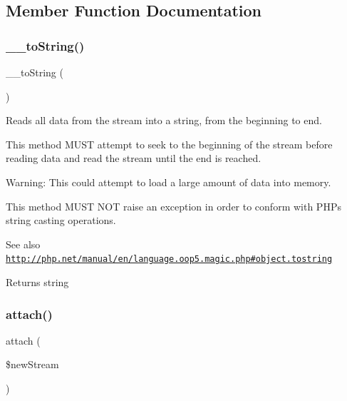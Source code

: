\subsection{Member Function Documentation}
\mbox{\label{class_pes_1_1_http_1_1_stream_a7516ca30af0db3cdbf9a7739b48ce91d}} 
\subsubsection{\texorpdfstring{\+\_\+\+\_\+to\+String()}{\_\_toString()}}
{\footnotesize\ttfamily \+\_\+\+\_\+to\+String (\begin{DoxyParamCaption}{ }\end{DoxyParamCaption})}

Reads all data from the stream into a string, from the beginning to end.

This method M\+U\+ST attempt to seek to the beginning of the stream before reading data and read the stream until the end is reached.

Warning\+: This could attempt to load a large amount of data into memory.

This method M\+U\+ST N\+OT raise an exception in order to conform with P\+HP\textquotesingle{}s string casting operations.

\begin{DoxySeeAlso}{See also}
\href{http://php.net/manual/en/language.oop5.magic.php#object.tostring}{\tt http\+://php.\+net/manual/en/language.\+oop5.\+magic.\+php\#object.\+tostring} 
\end{DoxySeeAlso}
\begin{DoxyReturn}{Returns}
string 
\end{DoxyReturn}
\mbox{\label{class_pes_1_1_http_1_1_stream_a4db3051497ce0497bbb9a31a0f54e58d}} 
\subsubsection{\texorpdfstring{attach()}{attach()}}
{\footnotesize\ttfamily attach (\begin{DoxyParamCaption}\item[{}]{\$new\+Stream }\end{DoxyParamCaption})\hspace{0.3cm}{\ttfamily [protected]}}

